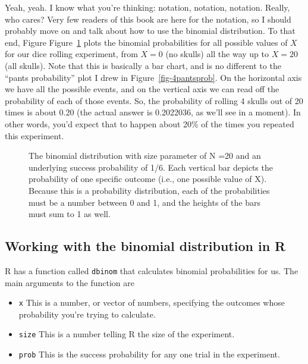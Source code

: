 \documentclass[
  letterpaper,
  DIV=11,
  numbers=noendperiod]{scrreprt}
\begin{document}
Yeah, yeah. I know what you're thinking: notation, notation, notation.
Really, who cares? Very few readers of this book are here for the
notation, so I should probably move on and talk about how to use the
binomial distribution. To that end, Figure Figure~\ref{fig-4binomial1}
plots the binomial probabilities for all possible values of \(X\) for
our dice rolling experiment, from \(X=0\) (no skulls) all the way up to
\(X=20\) (all skulls). Note that this is basically a bar chart, and is
no different to the ``pants probability'' plot I drew in
Figure~\ref{fig-4pantsprob}. On the horizontal axis we have all the
possible events, and on the vertical axis we can read off the
probability of each of those events. So, the probability of rolling 4
skulls out of 20 times is about 0.20 (the actual answer is 0.2022036, as
we'll see in a moment). In other words, you'd expect that to happen
about 20\% of the times you repeated this experiment.

\begin{figure}


\caption{\label{fig-4binomial1}The binomial distribution with size
parameter of N =20 and an underlying success probability of 1/6. Each
vertical bar depicts the probability of one specific outcome (i.e., one
possible value of X). Because this is a probability distribution, each
of the probabilities must be a number between 0 and 1, and the heights
of the bars must sum to 1 as well.}

\end{figure}%

\subsection{Working with the binomial distribution in
R}\label{working-with-the-binomial-distribution-in-r}

R has a function called \texttt{dbinom} that calculates binomial
probabilities for us. The main arguments to the function are

\begin{itemize}
\item
  \texttt{x} This is a number, or vector of numbers, specifying the
  outcomes whose probability you're trying to calculate.
\item
  \texttt{size} This is a number telling R the size of the experiment.
\item
  \texttt{prob} This is the success probability for any one trial in the
  experiment.
\end{itemize}
\end{document}
